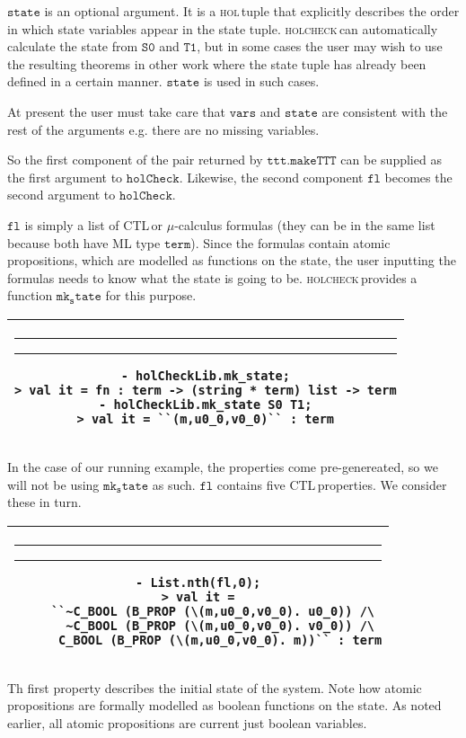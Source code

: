 \documentclass{article}
\makeatletter
\newcommand{\ctl}{\textsf{CTL}\,}
\newcommand{\hc}{\textsc{holcheck\,}}
\newcommand{\hol}{\textsc{hol\,}}
\newlength{\hsbw}
\newcounter{sessioncount}
\newcommand\MLSpacing{13pt}
\newenvironment{session}{\begin{flushleft}
 \begin{tabular}{@{}|c@{}|@{}}\hline 
 \begin{minipage}[b]{\hsbw}
 \vspace*{-.5pt}
 \begin{flushright}
 \rule{0.01in}{.15in}\rule{0.3in}{0.01in}\hspace{-0.35in}
 \raisebox{0.04in}{\makebox[0.3in][c]{\footnotesize\sl \thesessioncount}}
 \end{flushright}
 \vspace*{-.45in}
 \begingroup\small\baselineskip\MLSpacing}{\endgroup\end{minipage}\\ \hline 
 \end{tabular}
 \end{flushleft}
 \stepcounter{sessioncount}}
\makeatother
\begin{document}
\(\mathtt{state}\) is an optional argument. It is a \hol tuple that explicitly describes the order in which state variables appear in the state tuple. \hc can automatically calculate the state from \(\mathtt{S0}\) and \(\mathtt{T1}\), but in some cases the user may wish to use the resulting theorems in other work where the state tuple has already been defined in a certain manner. \(\mathtt{state}\) is used in such cases.

At present the user must take care that \(\mathtt{vars}\) and \(\mathtt{state}\) are consistent with the rest of the arguments e.g. there are no missing variables. 

So the first component of the pair returned by \(\mathtt{ttt.makeTTT}\) can be supplied as the first argument to \(\mathtt{holCheck}\). Likewise, the second component \(\mathtt{fl}\) becomes the second argument to  \(\mathtt{holCheck}\).

\(\mathtt{fl}\) is simply a list of \ctl or \(\mu\)-calculus formulas (they can be in the same list because both have ML type \(\mathtt{term}\)). Since the formulas contain atomic propositions, which are modelled as functions on the state, the user inputting the formulas needs to know what the state is going to be. \hc provides a function \(\mathtt{mk_state}\) for this purpose.

\begin{session}
\begin{verbatim} 
- holCheckLib.mk_state;
> val it = fn : term -> (string * term) list -> term
- holCheckLib.mk_state S0 T1;
> val it = ``(m,u0_0,v0_0)`` : term
\end{verbatim}
\end{session}

In the case of our running example, the properties come pre-genereated, so we will not be using \(\mathtt{mk_state}\) as such. \(\mathtt{fl}\) contains five \ctl properties. We consider these in turn.

\begin{session}
\begin{verbatim} 
- List.nth(fl,0);
> val it =
    ``~C_BOOL (B_PROP (\(m,u0_0,v0_0). u0_0)) /\
      ~C_BOOL (B_PROP (\(m,u0_0,v0_0). v0_0)) /\
      C_BOOL (B_PROP (\(m,u0_0,v0_0). m))`` : term
\end{verbatim}
\end{session}

Th first property describes the initial state of the system. Note how atomic propositions are formally modelled as boolean functions on the state. As noted earlier, all atomic propositions are current just boolean variables.
\end{document}

